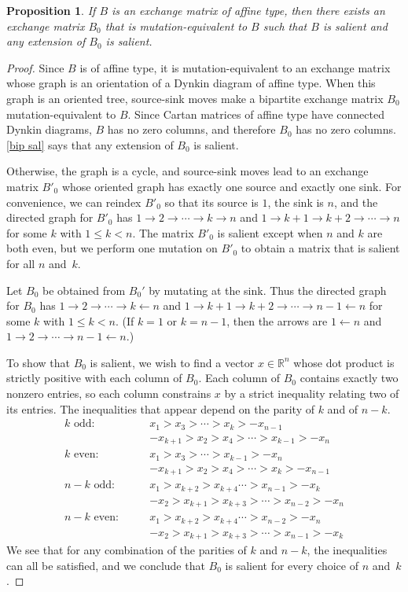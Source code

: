 \documentclass{amsart}
\newtheorem{proposition}{Proposition}[section]
\theoremstyle{definition}
\theoremstyle{remark}
\numberwithin{equation}{section}
\newcommand{\reals}{\mathbb R}
\newcommand{\0}{{\mathbf{0}}}
\begin{document}
\begin{proposition}\label{affine salient}
If $B$ is an exchange matrix of affine type, then there exists an exchange matrix $B_0$ that is mutation-equivalent to $B$ such that $B$ is salient and any extension of $B_0$ is salient.
\end{proposition}
\begin{proof}
Since $B$ is of affine type, it is mutation-equivalent to an exchange matrix whose graph is an orientation of a Dynkin diagram of affine type.
When this graph is an oriented tree, source-sink moves make a bipartite exchange matrix $B_0$ mutation-equivalent to $B$.
Since Cartan matrices of affine type have connected Dynkin diagrams, $B$ has no zero columns, and therefore $B_0$ has no zero columns.
\cref{bip sal} says that any extension of $B_0$ is salient.

Otherwise, the graph is a cycle, and source-sink moves lead to an exchange matrix $B'_0$ whose oriented graph has exactly one source and exactly one sink.
For convenience, we can reindex $B'_0$ so that its source is $1$, the sink is $n$, and the directed graph for $B'_0$ has ${1\to2\to\cdots\to k\to n}$ and $1\to k+1\to k+2\to\cdots\to n$ for some $k$ with $1\le k<n$.
The matrix $B'_0$ is salient except when $n$ and $k$ are both even, but we perform one mutation on $B'_0$ to obtain a matrix that is salient for all $n$ and~$k$.

Let $B_0$ be obtained from $B_0'$ by mutating at the sink.
Thus the directed graph for $B_0$ has ${1\to2\to\cdots\to k\leftarrow n}$ and $1\to k+1\to k+2\to\cdots\to n-1\leftarrow n$ for some $k$ with $1\le k<n$.
(If $k=1$ or $k=n-1$, then the  arrows are $1\leftarrow n$ and $1\to2\to\cdots\to n-1\leftarrow n$.)

To show that $B_0$ is salient, we wish to find a vector $x\in\reals^n$ whose dot product is strictly positive with each column of $B_0$.
Each column of $B_0$ contains exactly two nonzero entries, so each column constrains $x$ by a strict inequality relating two of its entries.
The inequalities that appear depend on the parity of $k$ and of $n-k$.
\begin{align*}
k\text{ odd:}\qquad
&x_1>x_3>\cdots>x_k>-x_{n-1}\\
&-x_{k+1}>x_2>x_4>\cdots>x_{k-1}>-x_n\\
k\text{ even:}\qquad
&x_1>x_3>\cdots>x_{k-1}>-x_n\\
&-x_{k+1}>x_2>x_4>\cdots>x_k>-x_{n-1}\\
n-k\text{ odd:}\qquad
&x_1>x_{k+2}>x_{k+4}\cdots>x_{n-1}>-x_k\\
&-x_2>x_{k+1}>x_{k+3}>\cdots>x_{n-2}>-x_n\\
n-k\text{ even:}\qquad
&x_1>x_{k+2}>x_{k+4}\cdots>x_{n-2}>-x_n\\
&-x_2>x_{k+1}>x_{k+3}>\cdots>x_{n-1}>-x_k
\end{align*}
We see that for any combination of the parities of $k$ and $n-k$, the inequalities can all be satisfied, and we conclude that $B_0$ is salient for every choice of $n$ and~$k$.


\end{proof}
\end{document}
